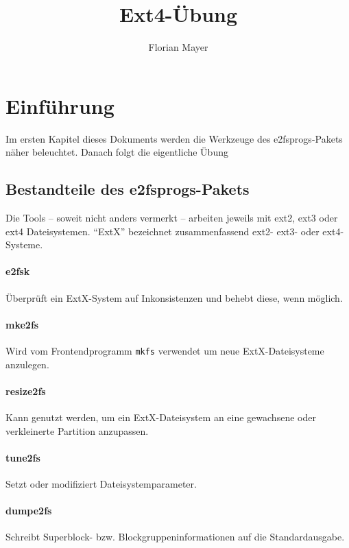 \documentclass[11pt,a4paper]{article}
\def\inlinebash{\lstinline[style=bash]}
\begin{document}
\title{\color{black} Ext4-Übung}
\author{\color{darkblue} Florian Mayer}
\maketitle

\tableofcontents

\section{Einführung}
Im ersten Kapitel dieses Dokuments werden die 
Werkzeuge des e2fsprogs-Pakets näher beleuchtet.
Danach folgt die eigentliche Übung

\subsection{Bestandteile des e2fsprogs-Pakets}
Die Tools -- soweit nicht anders vermerkt -- arbeiten 
jeweils mit ext2, ext3 oder ext4 Dateisystemen. ``ExtX'' bezeichnet
zusammenfassend ext2- ext3- oder ext4-Systeme.

\paragraph{e2fsk}
	Überprüft ein ExtX-System auf Inkonsistenzen und behebt diese, wenn möglich.

\paragraph{mke2fs}
	Wird vom Frontendprogramm \inlinebash$mkfs$ verwendet um neue ExtX-Dateisysteme anzulegen.

\paragraph{resize2fs}
	Kann genutzt werden, um ein ExtX-Dateisystem an eine gewachsene oder
	verkleinerte Partition anzupassen.

\paragraph{tune2fs}
	Setzt oder modifiziert Dateisystemparameter.

\paragraph{dumpe2fs}
	Schreibt Superblock- bzw. Blockgruppeninformationen auf die Standardausgabe.
\end{document}
